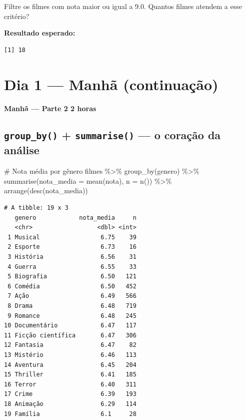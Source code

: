 \documentclass[
  letterpaper,
]{scrbook}
\newenvironment{Shaded}{\begin{snugshade}}{\end{snugshade}}
\newcommand{\AttributeTok}[1]{\textcolor[rgb]{0.40,0.45,0.13}{#1}}
\newcommand{\CommentTok}[1]{\textcolor[rgb]{0.37,0.37,0.37}{#1}}
\newcommand{\FunctionTok}[1]{\textcolor[rgb]{0.28,0.35,0.67}{#1}}
\newcommand{\NormalTok}[1]{\textcolor[rgb]{0.00,0.23,0.31}{#1}}
\newcommand{\SpecialCharTok}[1]{\textcolor[rgb]{0.37,0.37,0.37}{#1}}
\begin{document}
Filtre os filmes com nota maior ou igual a 9.0. Quantos filmes atendem a
esse critério?

\textbf{Resultado esperado:}

\begin{verbatim}
[1] 18
\end{verbatim}

\chapter{Dia 1 --- Manhã
(continuação)}\label{dia-1-manhuxe3-continuauxe7uxe3o}

\textbf{Manhã --- Parte 2 \textbar{} 2 horas}

\section*{\texorpdfstring{\texttt{group\_by()} + \texttt{summarise()}
--- o coração da
análise}{group\_by() + summarise() --- o coração da análise}}\label{group_by-summarise-o-corauxe7uxe3o-da-anuxe1lise}


\begin{Shaded}
\begin{Highlighting}[]
\CommentTok{\# Nota média por gênero}
\NormalTok{filmes }\SpecialCharTok{\%\textgreater{}\%}
  \FunctionTok{group\_by}\NormalTok{(genero) }\SpecialCharTok{\%\textgreater{}\%}
  \FunctionTok{summarise}\NormalTok{(}\AttributeTok{nota\_media =} \FunctionTok{mean}\NormalTok{(nota), }\AttributeTok{n =} \FunctionTok{n}\NormalTok{()) }\SpecialCharTok{\%\textgreater{}\%}
  \FunctionTok{arrange}\NormalTok{(}\FunctionTok{desc}\NormalTok{(nota\_media))}
\end{Highlighting}
\end{Shaded}

\begin{verbatim}
# A tibble: 19 x 3
   genero            nota_media     n
   <chr>                  <dbl> <int>
 1 Musical                 6.75    39
 2 Esporte                 6.73    16
 3 História                6.56    31
 4 Guerra                  6.55    33
 5 Biografia               6.50   121
 6 Comédia                 6.50   452
 7 Ação                    6.49   566
 8 Drama                   6.48   719
 9 Romance                 6.48   245
10 Documentário            6.47   117
11 Ficção científica       6.47   306
12 Fantasia                6.47    82
13 Mistério                6.46   113
14 Aventura                6.45   204
15 Thriller                6.41   185
16 Terror                  6.40   311
17 Crime                   6.39   193
18 Animação                6.29   114
19 Família                 6.1     28
\end{verbatim}
\end{document}
